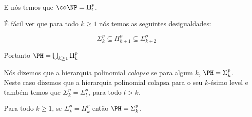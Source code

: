 E nós temos que $\co\NP = \Pi_{1}^{p}$.

É fácil ver que para todo $k \geq 1$ nós temos as seguintes desigualdades:

\begin{equation*}
    \Sigma_{k}^{p} \subseteq \Pi_{k + 1}^{p} \subseteq \Sigma_{k + 2}^{p}
\end{equation*}

Portanto $\PH = \bigcup_{k \geq 1} \Pi_{k}^{p}$

Nós dizemos que a hierarquia polinomial \emph{colapsa} se para algum $k$, $\PH = \Sigma_{k}^{p}$. Neste caso dizemos que a hierarquia polinomial colapsa para o seu $k$-ésimo level e também temos que $\Sigma_{k}^{p} = \Sigma_{l}^{p}$, para todo $l > k$.

\begin{teo} \label{teo: phcollapse}

Para todo $k \geq 1$, se $\Sigma_{k}^{p} = \Pi_{k}^{p}$ então $\PH = \Sigma_{k}^{p}$.

\end{teo}

